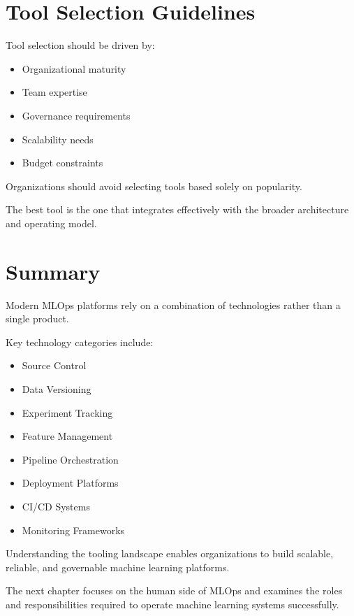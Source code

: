 \section{Tool Selection Guidelines}

Tool selection should be driven by:

\begin{itemize}
    \item Organizational maturity
    \item Team expertise
    \item Governance requirements
    \item Scalability needs
    \item Budget constraints
\end{itemize}

Organizations should avoid selecting tools based solely on popularity.

The best tool is the one that integrates effectively with the broader architecture and operating model.

\section{Summary}

Modern MLOps platforms rely on a combination of technologies rather than a single product.

Key technology categories include:

\begin{itemize}
    \item Source Control
    \item Data Versioning
    \item Experiment Tracking
    \item Feature Management
    \item Pipeline Orchestration
    \item Deployment Platforms
    \item CI/CD Systems
    \item Monitoring Frameworks
\end{itemize}

Understanding the tooling landscape enables organizations to build scalable, reliable, and governable machine learning platforms.

The next chapter focuses on the human side of MLOps and examines the roles and responsibilities required to operate machine learning systems successfully.

